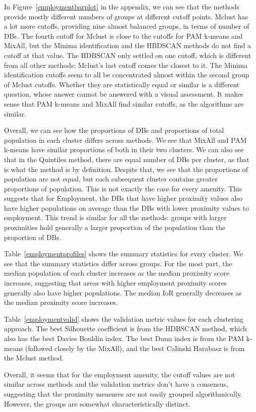 \documentclass[11pt, a4paper]{article}
\begin{document}
In Figure~\ref{employmentbarplot} in the appendix, we can see that the methods provide mostly different numbers of groups at different cutoff points. Mclust has a lot more cutoffs, providing nine almost balanced groups, in terms of number of DBs. The fourth cutoff for Mclust is close to the cutoffs for PAM k-means and MixAll, but the Minima identification and the HBDSCAN methods do not find a cutoff at that value. The HDBSCAN only settled on one cutoff, which is different from all other methods: Mclust's last cutoff comes the closest to it. The Minima identification cutoffs seem to all be concentrated almost within the second group of Mclust cutoffs. Whether they are statistically equal or similar is a different question, whose answer cannot be answered with a visual assessment. It makes sense that PAM k-means and MixAll find similar cutoffs, as the algorithms are similar.
\par
Overall, we can see how the proportions of DBs and proportions of total population in each cluster differs across methods. We see that MixAll and PAM k-means have similar proportions of both in their two clusters. We can also see that in the Quintiles method, there are equal number of DBs per cluster, as that is what the method is by definition. Despite that, we see that the proportions of population are not equal, but each subsequent cluster contains greater proportions of population. This is not exactly the case for every amenity. This suggests that for Employment, the DBs that have higher proximity values also have higher populations on average than the DBs with lower proximity values to employment. This trend is similar for all the methods: groups with larger proximities hold generally a larger proportion of the population than the proportion of DBs.
\par
Table~\ref{employmentprofiles} shows the summary statistics for every cluster. We see that the summary statistics differ across groups. For the most part, the median population of each cluster increases as the median proximity score increases, suggesting that areas with higher employment proximity scores generally also have higher populations. The median IoR generally decreases as the median proximity score increases.
\par
Table~\ref{employmentvalid} shows the validation metric values for each clustering approach. The best Silhouette coefficient is from the HDBSCAN method, which also has the best Davies Bouldin index. The best Dunn index is from the PAM k-means (followed closely by the MixAll), and the best Calinski Harabasz is from the Mclust method.
\par
Overall, it seems that for the employment amenity, the cutoff values are not similar across methods and the validation metrics don’t have a consensus, suggesting that the proximity measures are not easily grouped algorithmically. However, the groups are somewhat characteristically distinct.
\end{document}
